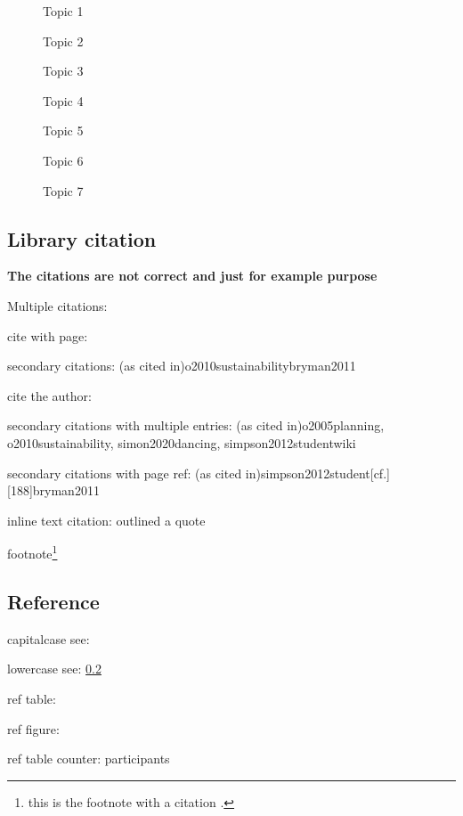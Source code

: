 			\begin{figure}[!ht]
				\centering
				\label{fig:TopicList}
				\vspace{1em}
				\begin{compactenum}[A)]%
					\item Topic 1
					\item Topic 2
					\item Topic 3
					\item Topic 4
					\item Topic 5
					\item Topic 6
					\item Topic 7
				\end{compactenum}
			\end{figure}
			
	\subsection{Library citation}
	    \textbf{The citations are not correct and just for example purpose}
	    
		\begin{compactitem} %
    	    \item Multiple citations:  \parencite{o2005planning, o2010sustainability}
    	    \item cite with page: \parencite[][289]{bryman2011}
    	    \item secondary citations: \pconnectcites(as cited in){o2010sustainability}{bryman2011}
    	    \item cite the author:  \citeauthor{o2010sustainability}
    	    \item secondary citations with multiple entries:  \pconnectcites(as cited in){o2005planning, o2010sustainability, simon2020dancing, simpson2012student}{wiki}
    	    \item secondary citations with page ref:  \pconnectcites(as cited in){simpson2012student}[cf.][188]{bryman2011}
    	    \item inline text citation:  \textcite[cf.][218]{bryman2011} outlined a quote
    	    \item footnote\footnote{this is the footnote with a citation \parencite[cf.][]{wiki}.}
	    \end{compactitem}
	    
	 \subsection{Reference}\label{sec:example_reference}
	    capitalcase see: 
	    
	    lowercase see: \cref{sec:example_reference} 
	    
	    ref table: 
	    
	    ref figure: 
	    
	    ref table counter:  participants